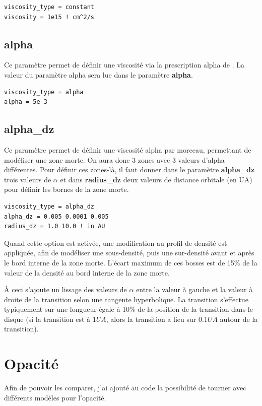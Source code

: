 \begin{verbatim}
viscosity_type = constant
viscosity = 1e15 ! cm^2/s
\end{verbatim}

\subsection{alpha}
Ce paramètre permet de définir une viscosité via la prescription alpha de \cite{shakura1973black}. La valeur du paramètre alpha sera lue dans le paramètre \textbf{alpha}. 

\begin{verbatim}
viscosity_type = alpha
alpha = 5e-3
\end{verbatim}

\subsection{alpha\_dz}\label{sec:dead_zone}
Ce paramètre permet de définir une viscosité alpha par morceau, permettant de modéliser une zone morte. On aura donc 3 zones
avec 3 valeurs d'alpha différentes. Pour définir ces zones-là, il faut donner dans le paramètre \textbf{alpha\_dz} trois valeurs
de $\alpha$ et dans \textbf{radius\_dz} deux valeurs de distance orbitale (en \unit{UA}) pour définir les bornes de la zone
morte.
\begin{verbatim}
viscosity_type = alpha_dz
alpha_dz = 0.005 0.0001 0.005
radius_dz = 1.0 10.0 ! in AU
\end{verbatim}

Quand cette option est activée, une modification au profil de densité est appliquée, afin de modéliser une sous-densité, puis une sur-densité avant et après le bord interne de la zone morte. L'écart maximum de ces bosses est de 15\% de la valeur de la densité au bord interne de la zone morte. 

À ceci s'ajoute un lissage des valeurs de $\alpha$ entre la valeur à gauche et la valeur à droite de la transition selon une tangente hyperbolique. La transition s'effectue typiquement sur une longueur égale à 10\% de la position de la transition dans le disque (si la transition est à $1\unit{UA}$, alors la transition a lieu sur $0.1\unit{UA}$ autour de la transition).

\section{Opacité}
Afin de pouvoir les comparer, j'ai ajouté au code la possibilité de tourner avec différents modèles pour l'opacité. 

